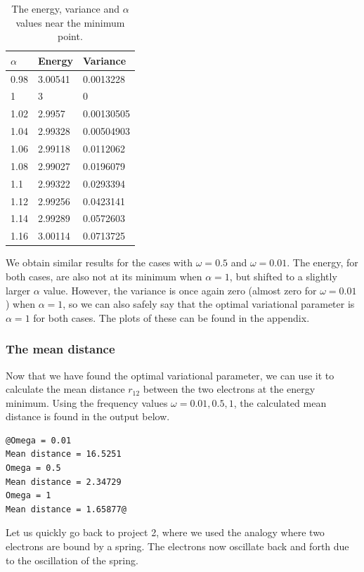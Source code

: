 \documentclass[12pt]{article}
\begin{document}
\begin{table}
\begin{center}
	\begin{tabular}{| l | l | l |}
	\hline 
	$\alpha$ & Energy & Variance \\ \hline
	0.98 & 3.00541 & 0.0013228 \\
	1 & 3 & 0 \\
	1.02 & 2.9957 & 0.00130505 \\
	1.04 & 2.99328 & 0.00504903 \\
	1.06 & 2.99118 & 0.0112062 \\
	1.08 & 2.99027 & 0.0196079 \\
	1.1 & 2.99322 & 0.0293394 \\
	1.12 & 2.99256 & 0.0423141 \\
	1.14 & 2.99289 & 0.0572603 \\
	1.16 & 3.00114 & 0.0713725 \\ \hline
	\end{tabular}
\caption{The energy, variance and $\alpha$ values near the minimum point.}
\end{center}
\label{table:AlphaMinimum_omega1}
\end{table}
We obtain similar results for the cases with $\omega = 0.5$ and $\omega = 0.01$. The energy, for both cases, are also not at its minimum when $\alpha = 1$, but shifted to a slightly larger $\alpha$ value. However, the variance is once again zero (almost zero for $\omega = 0.01$) when $\alpha = 1$, so we can also safely say that the optimal variational parameter is $\alpha = 1$ for both cases. The plots of these can be found in the appendix.
\FloatBarrier
\subsubsection{The mean distance}
Now that we have found the optimal variational parameter, we can use it to calculate the mean distance $r_{12}$ between the two electrons at the energy minimum. Using the frequency values $\omega = 0.01, 0.5, 1$, the calculated mean distance is found in the output below.
\begin{lstlisting}
@Omega = 0.01
Mean distance = 16.5251
Omega = 0.5
Mean distance = 2.34729
Omega = 1
Mean distance = 1.65877@
\end{lstlisting}
Let us quickly go back to project 2, where we used the analogy where two electrons are bound by a spring. The electrons now oscillate back and forth due to the oscillation of the spring. 
\end{document}
